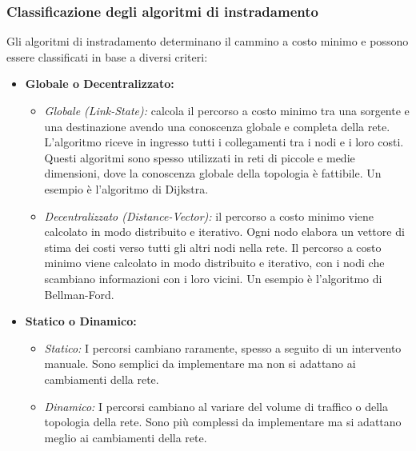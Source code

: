 \subsubsection*{Classificazione degli algoritmi di instradamento}
Gli algoritmi di instradamento determinano il cammino a costo minimo e possono essere classificati in base a diversi criteri:
\begin{itemize}
    \item \textbf{Globale o Decentralizzato:}
        \begin{itemize}
            \item \textit{Globale (Link-State):} calcola il percorso a costo minimo tra una sorgente e una destinazione avendo una conoscenza globale e completa della rete. L'algoritmo riceve in ingresso tutti i collegamenti tra i nodi e i loro costi. Questi algoritmi sono spesso utilizzati in reti di piccole e medie dimensioni, dove la conoscenza globale della topologia è fattibile. Un esempio è l'algoritmo di Dijkstra.
            \item \textit{Decentralizzato (Distance-Vector):} il percorso a costo minimo viene calcolato in modo distribuito e iterativo. Ogni nodo elabora un vettore di stima dei costi verso tutti gli altri nodi nella rete. Il percorso a costo minimo viene calcolato in modo distribuito e iterativo, con i nodi che scambiano informazioni con i loro vicini. Un esempio è l'algoritmo di Bellman-Ford.
        \end{itemize}
    \item \textbf{Statico o Dinamico:}
        \begin{itemize}
            \item \textit{Statico:} I percorsi cambiano raramente, spesso a seguito di un intervento manuale. Sono semplici da implementare ma non si adattano ai cambiamenti della rete.
            \item \textit{Dinamico:} I percorsi cambiano al variare del volume di traffico o della topologia della rete. Sono più complessi da implementare ma si adattano meglio ai cambiamenti della rete.
        \end{itemize}
\end{itemize}

